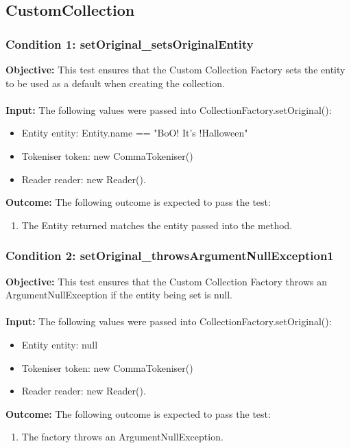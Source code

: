 \documentclass[a4paper,12pt]{article}
\begin{document}
	\subsection{CustomCollection}
		\subsubsection{Condition 1: setOriginal\_setsOriginalEntity}
			\textbf{Objective:} This test ensures that the Custom Collection Factory sets the entity to be used as a default when creating the collection.\\\\
			\textbf{Input:} The following values were passed into CollectionFactory.setOriginal():
				\begin{itemize}
					\item Entity entity: Entity.name == "BoO! It's !Halloween"
					\item Tokeniser token: new CommaTokeniser()
					\item Reader reader: new Reader().
				\end{itemize}
			\textbf{Outcome:} The following outcome is expected to pass the test:
				\begin{enumerate}
					\item The Entity returned matches the entity passed into the method.
				\end{enumerate}
		\subsubsection{Condition 2: setOriginal\_throwsArgumentNullException1}
			\textbf{Objective:} This test ensures that the Custom Collection Factory throws an ArgumentNullException if the entity being set is null.\\\\
			\textbf{Input:} The following values were passed into CollectionFactory.setOriginal():
				\begin{itemize}
					\item Entity entity: null
					\item Tokeniser token: new CommaTokeniser()
					\item Reader reader: new Reader().
				\end{itemize}
			\textbf{Outcome:} The following outcome is expected to pass the test:
				\begin{enumerate}
					\item The factory throws an ArgumentNullException.
				\end{enumerate}
\end{document}

